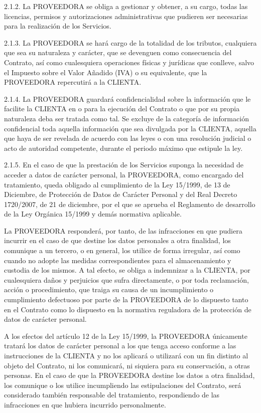 \documentclass[11pt,spanish,a4paper,]{article}
\begin{document}
2.1.2. La PROVEEDORA se obliga a gestionar y obtener, a su cargo, todas
las licencias, permisos y autorizaciones administrativas que pudieren
ser necesarias para la realización de los Servicios.

2.1.3. La PROVEEDORA se hará cargo de la totalidad de los tributos,
cualquiera que sea su naturaleza y carácter, que se devenguen como
consecuencia del Contrato, así como cualesquiera operaciones físicas y
jurídicas que conlleve, salvo el Impuesto sobre el Valor Añadido (IVA) o
su equivalente, que la PROVEEDORA repercutirá a la CLIENTA.

2.1.4. La PROVEEDORA guardará confidencialidad sobre la información que
le facilite la CLIENTA en o para la ejecución del Contrato o que por su
propia naturaleza deba ser tratada como tal. Se excluye de la categoría
de información confidencial toda aquella información que sea divulgada
por la CLIENTA, aquella que haya de ser revelada de acuerdo con las
leyes o con una resolución judicial o acto de autoridad competente,
durante el periodo máximo que estipule la ley.

2.1.5. En el caso de que la prestación de los Servicios suponga la
necesidad de acceder a datos de carácter personal, la PROVEEDORA, como
encargado del tratamiento, queda obligado al cumplimiento de la Ley
15/1999, de 13 de Diciembre, de Protección de Datos de Carácter Personal
y del Real Decreto 1720/2007, de 21 de diciembre, por el que se aprueba
el Reglamento de desarrollo de la Ley Orgánica 15/1999 y demás normativa
aplicable.

La PROVEEDORA responderá, por tanto, de las infracciones en que pudiera
incurrir en el caso de que destine los datos personales a otra
finalidad, los comunique a un tercero, o en general, los utilice de
forma irregular, así como cuando no adopte las medidas correspondientes
para el almacenamiento y custodia de los mismos. A tal efecto, se obliga
a indemnizar a la CLIENTA, por cualesquiera daños y perjuicios que sufra
directamente, o por toda reclamación, acción o procedimiento, que traiga
su causa de un incumplimiento o cumplimiento defectuoso por parte de la
PROVEEDORA de lo dispuesto tanto en el Contrato como lo dispuesto en la
normativa reguladora de la protección de datos de carácter personal.

A los efectos del artículo 12 de la Ley 15/1999, la PROVEEDORA
únicamente tratará los datos de carácter personal a los que tenga acceso
conforme a las instrucciones de la CLIENTA y no los aplicará o utilizará
con un fin distinto al objeto del Contrato, ni los comunicará, ni
siquiera para su conservación, a otras personas. En el caso de que la
PROVEEDORA destine los datos a otra finalidad, los comunique o los
utilice incumpliendo las estipulaciones del Contrato, será considerado
también responsable del tratamiento, respondiendo de las infracciones en
que hubiera incurrido personalmente.
\end{document}

